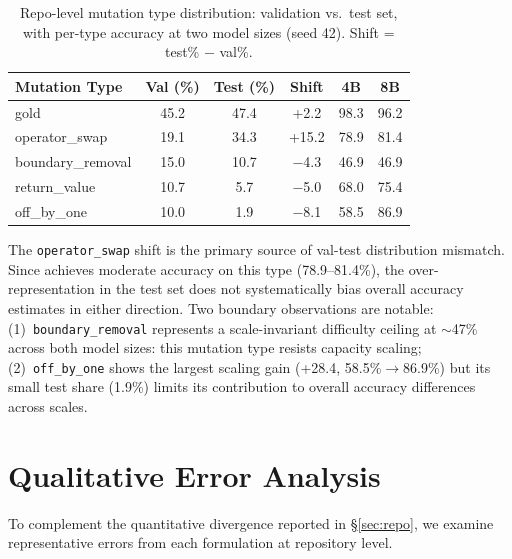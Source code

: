 \begin{table}[h]
\centering
\small
\caption{Repo-level mutation type distribution: validation vs.\ test set, with per-type \cls{} accuracy at two model sizes (seed 42). Shift = test\% $-$ val\%.}
\label{tab:mutation_distribution}
\setlength{\tabcolsep}{5pt}
\begin{tabular}{lccccc}
\toprule
\textbf{Mutation Type} & \textbf{Val (\%)} & \textbf{Test (\%)} & \textbf{Shift} & \textbf{\cls{} 4B} & \textbf{\cls{} 8B} \\
\midrule
gold & 45.2 & 47.4 & +2.2 & 98.3 & 96.2 \\
operator\_swap & 19.1 & 34.3 & +15.2 & 78.9 & 81.4 \\
boundary\_removal & 15.0 & 10.7 & $-$4.3 & 46.9 & 46.9 \\
return\_value & 10.7 & 5.7 & $-$5.0 & 68.0 & 75.4 \\
off\_by\_one & 10.0 & 1.9 & $-$8.1 & 58.5 & 86.9 \\
\bottomrule
\end{tabular}
\end{table}

The \texttt{operator\_swap} shift is the primary source of val-test distribution mismatch. Since \cls{} achieves moderate accuracy on this type (78.9--81.4\%), the over-representation in the test set does not systematically bias overall accuracy estimates in either direction. Two boundary observations are notable: (1)~\texttt{boundary\_removal} represents a scale-invariant difficulty ceiling at ${\sim}$47\% across both model sizes: this mutation type resists capacity scaling; (2)~\texttt{off\_by\_one} shows the largest scaling gain (+28.4\pp{}, 58.5\%$\to$86.9\%) but its small test share (1.9\%) limits its contribution to overall accuracy differences across scales.

\section{Qualitative Error Analysis}
\label{app:qualitative}

To complement the quantitative divergence reported in \S\ref{sec:repo}, we examine representative errors from each formulation at repository level.

